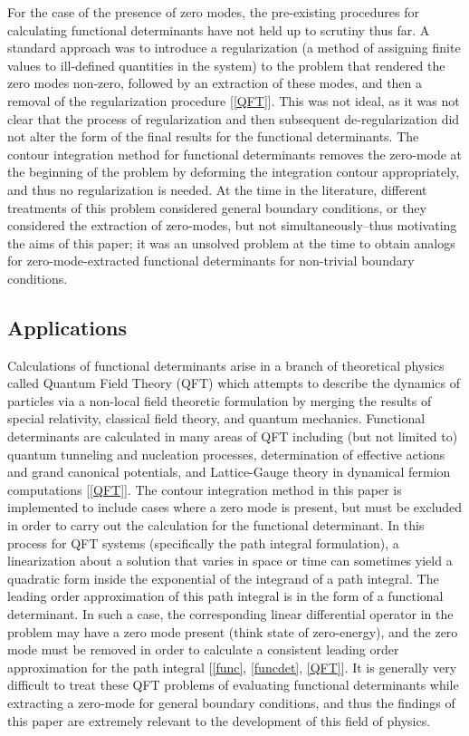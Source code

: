 \documentclass[12]{article}
\begin{document}
For the case of the presence of zero modes, the pre-existing procedures for calculating functional determinants have not held up to scrutiny thus far. A standard approach was to introduce a regularization (a method of assigning finite values to ill-defined quantities in the system) to the problem that rendered the zero modes non-zero, followed by an extraction of these modes, and then a removal of the regularization procedure [\ref{QFT}]. This was not ideal, as it was not clear that the process of regularization and then subsequent de-regularization did not alter the form of the final results for the functional determinants. The contour integration method for functional determinants removes the zero-mode at the beginning of the problem by deforming the integration contour appropriately, and thus no regularization is needed. At the time in the literature, different treatments of this problem considered general boundary conditions, or they considered the extraction of zero-modes, but not simultaneously--thus motivating the aims of this paper; it was an unsolved problem at the time to obtain analogs for zero-mode-extracted functional determinants for non-trivial boundary conditions.

\subsection{Applications}

Calculations of functional determinants arise in a branch of theoretical physics called Quantum Field Theory (QFT) which attempts to describe the dynamics of particles via a non-local field theoretic formulation by merging the results of special relativity, classical field theory, and quantum mechanics. Functional determinants are calculated in many areas of QFT including (but not limited to) quantum tunneling and nucleation processes, determination of effective actions and grand canonical potentials, and Lattice-Gauge theory in dynamical fermion computations [\ref{QFT}]. The contour integration method in this paper is implemented to include cases where a zero mode is present, but must be excluded in order to carry out the calculation for the functional determinant. In this process for QFT systems (specifically the path integral formulation), a linearization about a solution that varies in space or time can sometimes yield a quadratic form inside the exponential of the integrand of a path integral. The leading order approximation of this path integral is in the form of a functional determinant. In such a case, the corresponding linear differential operator in the problem may have a zero mode present (think state of zero-energy), and the zero mode must be removed in order to calculate a consistent leading order approximation for the path integral [\ref{func}, \ref{funcdet}, \ref{QFT}]. It is generally very difficult to treat these QFT problems of evaluating functional determinants while extracting a zero-mode for general boundary conditions, and thus the findings of this paper are extremely relevant to the development of this field of physics. 
\end{document}
